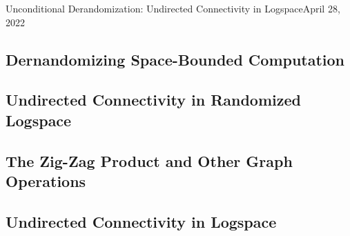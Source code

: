 \begin{lecture}{14}{Unconditional Derandomization: Undirected Connectivity in Logspace}{April 28, 2022}
\label{lec:14}

\subsection{Dernandomizing Space-Bounded Computation}

\subsection{Undirected Connectivity in Randomized Logspace}

\subsection{The Zig-Zag Product and Other Graph Operations}

\subsection{Undirected Connectivity in Logspace}

\end{lecture}
